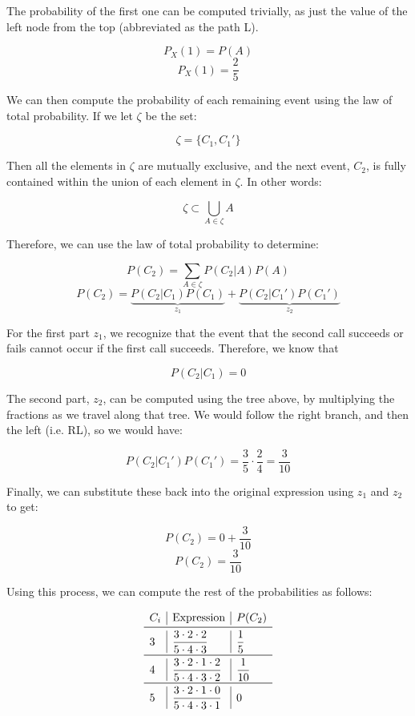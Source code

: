 \documentclass{article}
\begin{document}
The probability of the first one can be computed trivially, as just
the value of the left node from the top (abbreviated as the path L).

\[
P_X(1)=P(A)
\] \[
P_X(1)=\frac{2}{5}
\]

We can then compute the probability of each remaining event using the
law of total probability. If we let $\zeta$ be the set:

\[
\zeta=\{C_1,C_1'\}
\]

Then all the elements in $\zeta$ are mutually exclusive, and the next
event, $C_2$, is fully contained within the union of each element in
$\zeta$. In other words:

\[
\zeta\subset\bigcup\limits_{A\in\zeta}A
\]

Therefore, we can use the law of total probability to determine:

\[
P(C_2)=\sum\limits_{A\in\zeta}P(C_2|A)P(A)
\] \[
P(C_2)=\underbrace{P(C_2|C_1)P(C_1)}_{z_1}+\underbrace{P(C_2|C_1')P(C_1')}_{z_2}
\]

For the first part $z_1$, we recognize that the event that the second
call succeeds or fails cannot occur if the first call
succeeds. Therefore, we know that

\[
P(C_2|C_1)=0
\]

The second part, $z_2$, can be computed using the tree above, by
multiplying the fractions as we travel along that tree. We would
follow the right branch, and then the left (i.e. RL), so we would
have:

\[
P(C_2|C_1')P(C_1')=\frac{3}{5}\cdot\frac{2}{4}=\frac{3}{10}
\]

Finally, we can substitute these back into the original expression
using $z_1$ and $z_2$ to get:

\[
P(C_2)=0+\frac{3}{10}
\] \[
P(C_2)=\frac{3}{10}
\]

Using this process, we can compute the rest of the probabilities as
follows:

\[
\begin{array}{l|l|l}
C_i & \text{Expression} & P(C_2) \\
\midrule
3 & \dfrac{3\cdot2\cdot2}{5\cdot4\cdot3} & \dfrac{1}{5} \\
\midrule
4 & \dfrac{3\cdot2\cdot1\cdot2}{5\cdot4\cdot3\cdot2} & \dfrac{1}{10} \\
\midrule
5 & \dfrac{3\cdot2\cdot1\cdot0}{5\cdot4\cdot3\cdot1} & 0 \\
\end{array}
\]
\end{document}
